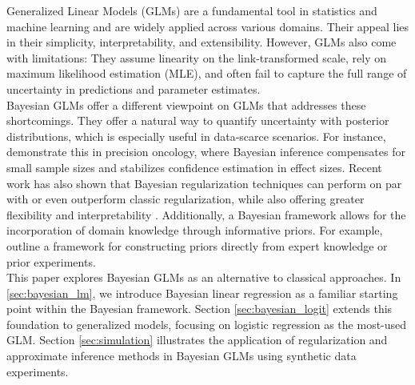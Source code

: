 Generalized Linear Models (GLMs) are a fundamental tool in statistics and machine learning and are widely applied across various domains.
Their appeal lies in their simplicity, interpretability, and extensibility.
However, GLMs also come with limitations:
They assume linearity on the link-transformed scale, rely on maximum likelihood estimation (MLE), and often fail to capture the full range of uncertainty in predictions and parameter estimates.\\

Bayesian GLMs offer a different viewpoint on GLMs that addresses these shortcomings.
They offer a natural way to quantify uncertainty with posterior distributions, which is especially useful in data-scarce scenarios.
For instance, \citet{sondhi_bayesian_2021} demonstrate this in precision oncology, where Bayesian inference compensates for small sample sizes and stabilizes confidence estimation in effect sizes.
Recent work has also shown that Bayesian regularization techniques can perform on par with or even outperform classic regularization, while also offering greater flexibility and interpretability \citep[see e.g.][]{van_erp_shrinkage_2019,celeux_regularization_2012}.
Additionally, a Bayesian framework allows for the incorporation of domain knowledge through informative priors.
For example, \citet{chien_informative_2023} outline a framework for constructing priors directly from expert knowledge or prior experiments.\\

This paper explores Bayesian GLMs as an alternative to classical approaches.
In \autoref{sec:bayesian_lm}, we introduce Bayesian linear regression as a familiar starting point within the Bayesian framework.
Section \ref{sec:bayesian_logit} extends this foundation to generalized models, focusing on logistic regression as the most-used GLM.
Section \ref{sec:simulation} illustrates the application of regularization and approximate inference methods in Bayesian GLMs using synthetic data experiments.\\



